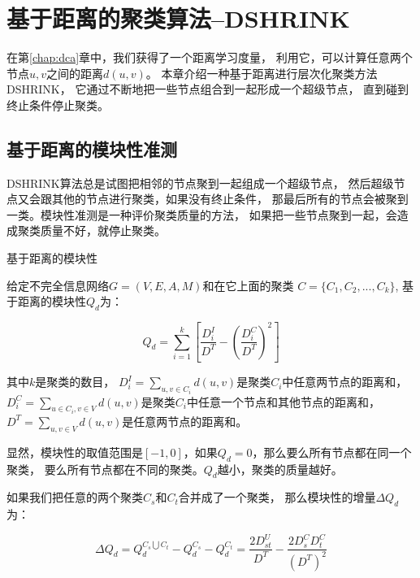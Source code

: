 \chapter{基于距离的聚类算法--DSHRINK}
\label{chap:dshrink}

在第\ref{chap:dca}章中，我们获得了一个距离学习度量，
利用它，可以计算任意两个节点$u, v$之间的距离$d(u, v)$。
本章介绍一种基于距离进行层次化聚类方法DSHRINK，
它通过不断地把一些节点组合到一起形成一个超级节点，
直到碰到终止条件停止聚类。

\section{基于距离的模块性准测}

DSHRINK算法总是试图把相邻的节点聚到一起组成一个超级节点，
然后超级节点又会跟其他的节点进行聚类，如果没有终止条件，
那最后所有的节点会被聚到一类。模块性准测是一种评价聚类质量的方法，
如果把一些节点聚到一起，会造成聚类质量不好，就停止聚类。

\begin{defn}{基于距离的模块性}
    \label{defn:density-based-modularity}

    给定不完全信息网络$G = (V, E, A, M)$和在它上面的聚类
    $C = \{C_1, C_2, ..., C_k\}$, 基于距离的模块性$Q_d$为：

    \begin{equation}
    Q_d = \sum_{i=1}^k [ \frac{D_i^I}{D^T} - (\frac{D_i^C}{D^T})^2]
    \end{equation}

    其中$k$是聚类的数目，
    $D_i^I = \sum_{u,v \in C_i} d(u,v)$是聚类$C_i$中任意两节点的距离和，
    $D_i^C = \sum_{u \in C_i, v \in V} d(u,v)$是聚类$C_i$中任意一个节点和其他节点的距离和，
    $D^T = \sum_{u,v \in V} d(u,v)$是任意两节点的距离和。

\end{defn}

显然，模块性的取值范围是$[-1,0]$，如果$Q_d = 0$，那么要么所有节点都在同一个聚类，
要么所有节点都在不同的聚类。$Q_d$越小，聚类的质量越好。

如果我们把任意的两个聚类$C_s$和$C_t$合并成了一个聚类，
那么模块性的增量$\Delta Q_d$为：

\begin{equation}
\label{equa:delta-qd}
    \Delta Q_d = Q_d^{C_s \bigcup C_t} - Q_d^{C_s} - Q_d^{C_t} = \frac{2D_{st}^U}{D^T} - \frac{2D_s^CD_t^C}{(D^T)^2}
\end{equation}

